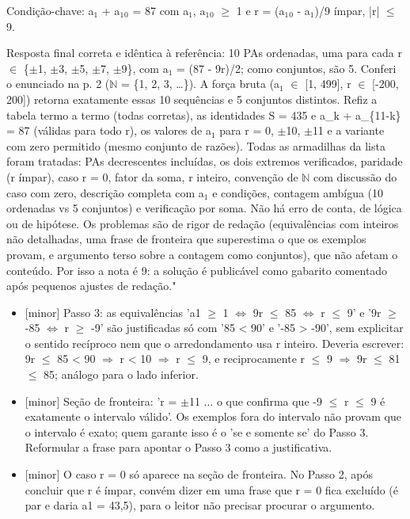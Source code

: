 \documentclass{article}%
\begin{document}
Condição{-}chave: a$_{1}$ + a$_{1}$$_{0}$ = 87 com a$_{1}$, a$_{1}$$_{0}$ $\geq$ 1 e r = (a$_{1}$$_{0}$ - a$_{1}$)/9 ímpar, |r| $\leq$ 9.\par %
Resposta final correta e idêntica à referência: 10 PAs ordenadas, uma para cada r $\in$ \{$\pm$1, $\pm$3, $\pm$5, $\pm$7, $\pm$9\}, com a$_{1}$ = (87 - 9r)/2; como conjuntos, são 5. Conferi o enunciado na p. 2 ($\mathbb{N}$ = \{1, 2, 3, \ldots{}\}). A força bruta (a$_{1}$ $\in$ {[}1, 499{]}, r $\in$ {[}-200, 200{]}) retorna exatamente essas 10 sequências e 5 conjuntos distintos. Refiz a tabela termo a termo (todas corretas), as identidades S = 435 e a\_k + a\_\{11-k\} = 87 (válidas para todo r), os valores de a$_{1}$ para r = 0, $\pm$10, $\pm$11 e a variante com zero permitido (mesmo conjunto de razões). Todas as armadilhas da lista foram tratadas: PAs decrescentes incluídas, os dois extremos verificados, paridade (r ímpar), caso r = 0, fator da soma, r inteiro, convenção de $\mathbb{N}$ com discussão do caso com zero, descrição completa com a$_{1}$ e condições, contagem ambígua (10 ordenadas vs 5 conjuntos) e verificação por soma. Não há erro de conta, de lógica ou de hipótese. Os problemas são de rigor de redação (equivalências com inteiros não detalhadas, uma frase de fronteira que superestima o que os exemplos provam, e argumento terso sobre a contagem como conjuntos), que não afetam o conteúdo. Por isso a nota é 9: a solução é publicável como gabarito comentado após pequenos ajustes de redação."%
\begin{itemize}%
\item%
{[}minor{]} Passo 3: as equivalências 'a1 $\geq$ 1 $\Leftrightarrow$ 9r $\leq$ 85 $\Leftrightarrow$ r $\leq$ 9' e '9r $\geq$ -85 $\Leftrightarrow$ r $\geq$ -9' são justificadas só com '85 < 90' e '-85 > -90', sem explicitar o sentido recíproco nem que o arredondamento usa r inteiro. Deveria escrever: 9r $\leq$ 85 < 90 $\Rightarrow$ r < 10 $\Rightarrow$ r $\leq$ 9, e reciprocamente r $\leq$ 9 $\Rightarrow$ 9r $\leq$ 81 $\leq$ 85; análogo para o lado inferior.%
\item%
{[}minor{]} Seção de fronteira: 'r = $\pm$11 ... o que confirma que -9 $\leq$ r $\leq$ 9 é exatamente o intervalo válido'. Os exemplos fora do intervalo não provam que o intervalo é exato; quem garante isso é o 'se e somente se' do Passo 3. Reformular a frase para apontar o Passo 3 como a justificativa.%
\item%
{[}minor{]} O caso r = 0 só aparece na seção de fronteira. No Passo 2, após concluir que r é ímpar, convém dizer em uma frase que r = 0 fica excluído (é par e daria a1 = 43,5), para o leitor não precisar procurar o argumento.%

\end{itemize}$$
\end{document}
